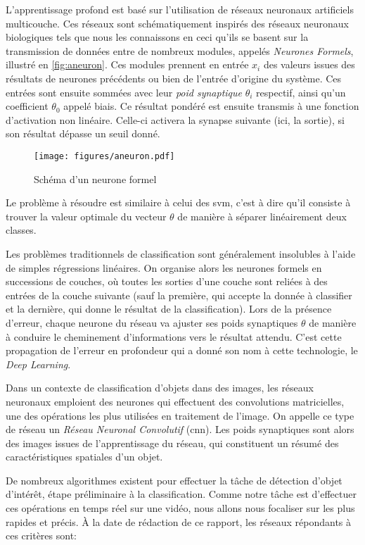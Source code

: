 			L'apprentissage profond est basé sur l'utilisation de réseaux neuronaux artificiels multicouche. Ces réseaux sont schématiquement inspirés des réseaux neuronaux biologiques tels que nous les connaissons en ceci qu'ils se basent sur la transmission de données entre de nombreux modules, appelés \emph{Neurones Formels}, illustré en \autoref{fig:aneuron}. Ces modules prennent en entrée $x_{i}$ des valeurs issues des résultats de neurones précédents ou bien de l'entrée d'origine du système. Ces entrées sont ensuite sommées avec leur \emph{poid synaptique} $\theta_{i}$ respectif, ainsi qu’un coefficient $\theta_{0}$ appelé biais. Ce résultat pondéré est ensuite transmis à une fonction d’activation non linéaire. Celle-ci activera la synapse suivante (ici, la sortie), si son résultat dépasse un seuil donné.
			\begin{figure}[h]
			{
				\centering
				\texttt{[image: figures/aneuron.pdf]}
				\caption{Schéma d'un neurone formel}
				\label{fig:aneuron}
			}
			\end{figure}
			Le problème à résoudre est similaire à celui des \gls{svm}, c'est à dire qu'il consiste à trouver la valeur optimale du vecteur $\theta$ de manière à séparer linéairement deux classes.
			\par
			Les problèmes traditionnels de classification sont généralement insolubles à l'aide de simples régressions linéaires. On organise alors les neurones formels en successions de couches, où toutes les sorties d'une couche sont reliées à des entrées de la couche suivante (sauf la première, qui accepte la donnée à classifier et la dernière, qui donne le résultat de la classification). Lors de la présence d'erreur, chaque neurone du réseau va ajuster ses poids synaptiques $\theta$ de manière à conduire le cheminement d'informations vers le résultat attendu. C'est cette propagation de l'erreur en profondeur qui a donné son nom à cette technologie, le \emph{Deep Learning}.
			\par
			Dans un contexte de classification d'objets dans des images, les réseaux neuronaux emploient des neurones qui effectuent des convolutions matricielles, une des opérations les plus utilisées en traitement de l'image. On appelle ce type de réseau un \emph{Réseau Neuronal Convolutif} (\gls{cnn}). Les poids synaptiques sont alors des images issues de l'apprentissage du réseau, qui constituent un résumé des caractéristiques spatiales d'un objet.
			\par
			De nombreux algorithmes existent pour effectuer la tâche de détection d'objet d'intérêt, étape préliminaire à la classification. Comme notre tâche est d'effectuer ces opérations en temps réel sur une vidéo, nous allons nous focaliser sur les plus rapides et précis. À la date de rédaction de ce rapport, les réseaux répondants à ces critères sont:
			
